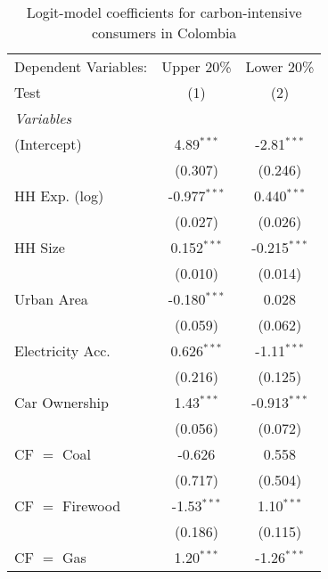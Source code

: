
\begin{table}[htbp!]
   \centering
   \small
   \begin{adjustbox}{width = 1\textwidth, max height = 0.95\textheight, center}
      \begin{threeparttable}[b]
         \caption{\label{tab:Logit_1_COL} Logit-model coefficients for carbon-intensive consumers in Colombia}
         \begin{tabular}{lcc}
            \tabularnewline \midrule \midrule
            Dependent Variables: & Upper 20\%     & Lower 20\%\\   
            Test                 & (1)            & (2)\\  
            \midrule
            \emph{Variables}\\
            (Intercept)          & 4.89$^{***}$   & -2.81$^{***}$\\   
                                 & (0.307)        & (0.246)\\   
            HH Exp. (log)        & -0.977$^{***}$ & 0.440$^{***}$\\   
                                 & (0.027)        & (0.026)\\   
            HH Size              & 0.152$^{***}$  & -0.215$^{***}$\\   
                                 & (0.010)        & (0.014)\\   
            Urban Area           & -0.180$^{***}$ & 0.028\\   
                                 & (0.059)        & (0.062)\\   
            Electricity Acc.     & 0.626$^{***}$  & -1.11$^{***}$\\   
                                 & (0.216)        & (0.125)\\   
            Car Ownership        & 1.43$^{***}$   & -0.913$^{***}$\\   
                                 & (0.056)        & (0.072)\\   
            CF $=$ Coal          & -0.626         & 0.558\\   
                                 & (0.717)        & (0.504)\\   
            CF $=$ Firewood      & -1.53$^{***}$  & 1.10$^{***}$\\   
                                 & (0.186)        & (0.115)\\   
            CF $=$ Gas           & 1.20$^{***}$   & -1.26$^{***}$\\   

\end{tabular}
\end{threeparttable}
\end{adjustbox}
\end{table}
